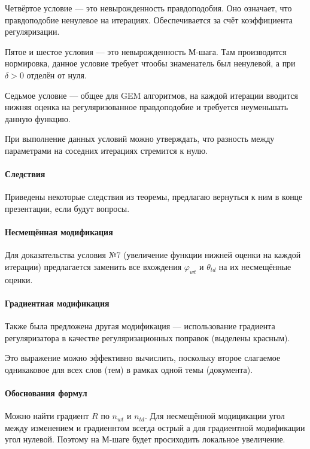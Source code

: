 \documentclass[12pt]{article}
\renewcommand{\phi}{\varphi}
\begin{document}
Четвёртое условие --- это невырожденность правдоподобия. Оно означает, что правдоподобие ненулевое на итерациях. Обеспечивается за счёт коэффициента регуляризации.

Пятое и шестое условия --- это невырожденность М-шага. Там производится нормировка, данное условие требует чтообы знаменатель был ненулевой, а при $\delta > 0$ отделён от нуля.

Седьмое условие --- общее для GEM алгоритмов, на каждой итерации вводится нижняя оценка на регуляризованное правдоподобие и требуется неуменьшать данную функцию.

При выполнение данных условий можно утверждать, что разность между параметрами на соседних итерациях стремится к нулю.

\paragraph{Следствия}
Приведены некоторые следствия из теоремы, предлагаю вернуться к ним в конце презентации, если будут вопросы.

\paragraph{Несмещённая модификация}
Для доказательства условия №7 (увеличение функции нижней оценки на каждой итерации) предлагается заменить все вхождения  $\phi_{wt}$ и $\theta_{td}$ на их несмещённые оценки.

\paragraph{Градиентная модификация}
Также была предложена другая модификация --- использование градиента регуляризатора в качестве регуляризационных поправок (выделены красным).

Это выражение можно эффективно вычислить, поскольку второе слагаемое одникаковое для всех слов (тем) в рамках одной темы (документа).

\paragraph{Обоснования формул}
Можно найти градиент $R$ по $n_{wt}$ и $n_{td}$. Для несмещённой модицикации угол между изменением и градиеннтом всегда острый а для градиентной модификации угол нулевой. Поэтому на М-шаге будет просиходить локальное увеличение.
\end{document}
